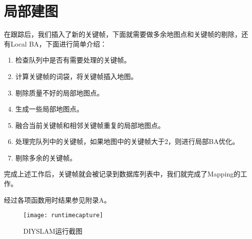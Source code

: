 \section{局部建图}
在跟踪后，我们插入了新的关键帧，下面就需要做多余地图点和关键帧的剔除，还有Local BA，下面进行简单介绍：\par
\begin{enumerate}
	\item 检查队列中是否有需要处理的关键帧。
	\item 计算关键帧的词袋，将关键帧插入地图。
	\item 剔除质量不好的局部地图点。
	\item 生成一些局部地图点。
	\item 融合当前关键帧和相邻关键帧重复的局部地图点。
	\item 处理完队列中的关键帧，如果地图中的关键帧大于2，则进行局部BA优化。
	\item 剔除多余的关键帧。
\end{enumerate}
完成上述工作后，关键帧就会被记录到数据库列表中，我们就完成了Mapping的工作。\par
经过各项函数用时结果参见附录A。
\begin{figure}
	\centering
	\texttt{[image: runtimecapture]}
	\caption{DIYSLAM运行截图}
\end{figure}










